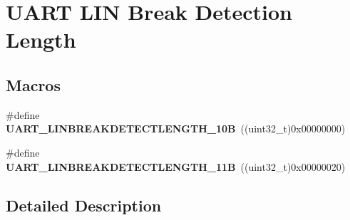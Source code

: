 \hypertarget{group___u_a_r_t___l_i_n___break___detection___length}{}\section{U\+A\+RT L\+IN Break Detection Length}
\label{group___u_a_r_t___l_i_n___break___detection___length}
\subsection*{Macros}
\begin{DoxyCompactItemize}
\item 
\#define {\bfseries U\+A\+R\+T\+\_\+\+L\+I\+N\+B\+R\+E\+A\+K\+D\+E\+T\+E\+C\+T\+L\+E\+N\+G\+T\+H\+\_\+10B}~((uint32\+\_\+t)0x00000000)\hypertarget{group___u_a_r_t___l_i_n___break___detection___length_ga027616b7a36b36e0e51ffee947533624}{}\label{group___u_a_r_t___l_i_n___break___detection___length_ga027616b7a36b36e0e51ffee947533624}

\item 
\#define {\bfseries U\+A\+R\+T\+\_\+\+L\+I\+N\+B\+R\+E\+A\+K\+D\+E\+T\+E\+C\+T\+L\+E\+N\+G\+T\+H\+\_\+11B}~((uint32\+\_\+t)0x00000020)\hypertarget{group___u_a_r_t___l_i_n___break___detection___length_ga2f66fcd37de7a3ca9e1101305f2e23e6}{}\label{group___u_a_r_t___l_i_n___break___detection___length_ga2f66fcd37de7a3ca9e1101305f2e23e6}

\end{DoxyCompactItemize}


\subsection{Detailed Description}
